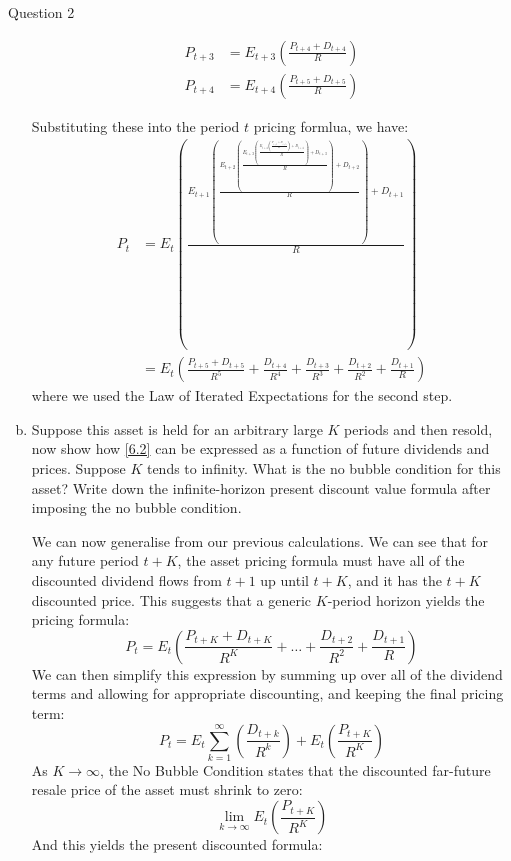\documentclass[a4paper]{article}
\newif\IfInSansMode
\begin{document}
\begin{questionbox}{Question 2}
\begin{enumerate}[(a)]
\begin{explanationbox}
\begin{align*}
					P_{t+3} &= E_{t+3} \left( \frac{P_{t+4} + D_{t+4}}{R} \right)\\
					P_{t+4} &= E_{t+4} \left( \frac{P_{t+5} + D_{t+5}}{R} \right)
				\end{align*}
			\end{explanationbox}
			\begin{explanationbox}
				Substituting these into the period \( t \) pricing formlua, we have:
				\begin{align*}
					P_t &= E_t \left( \frac{E_{t+1} \left( \frac{E_{t+2} \left( \frac{E_{t+3} \left( \frac{E_{t+4} \left( \frac{P_{t+5} + D_{t+5}}{R} \right) + D_{t+4}}{R} \right) + D_{t+3}}{R} \right) + D_{t+2}}{R} \right) + D_{t+1}}{R} \right)\\
					&= E_t \left( \frac{P_{t+5} + D_{t+5}}{R^5} + \frac{D_{t+4}}{R^4}+ \frac{D_{t+3}}{R^3}+ \frac{D_{t+2}}{R^2} + \frac{D_{t+1}}{R} \right)
				\end{align*}
				where we used the Law of Iterated Expectations for the second step.
			\end{explanationbox}
			\item Suppose this asset is held for an arbitrary large \( K \) periods and then resold, now show how \cref{6.2} can be expressed as a function of future dividends and prices. Suppose \( K \) tends to inﬁnity. What is the no bubble condition for this asset? Write down the inﬁnite-horizon present discount value formula after imposing the no bubble condition.
			\begin{explanationbox}
				We can now generalise from our previous calculations. We can see that for any future period \( t+K \), the asset pricing formula must have all of the discounted dividend ﬂows from \( t+1 \) up until \( t+K \), and it has the \( t+K \) discounted price. This suggests that a generic \( K \)-period horizon yields the pricing formula:
				\[
					P_t = E_t \left( \frac{P_{t+K} + D_{t+K}}{R^K} + \dots + \frac{D_{t+2}}{R^2} + \frac{D_{t+1}}{R} \right)
				\]
				We can then simplify this expression by summing up over all of the dividend terms and allowing for appropriate discounting, and keeping the ﬁnal pricing term:
				\[
					P_t = E_t \sum_{k=1}^\infty \left( \frac{D_{t+k}}{R^k} \right) + E_t \left( \frac{P_{t+K}}{R^K} \right)
				\]
				As \( K\rightarrow\infty \), the No Bubble Condition states that the discounted far-future resale price of the asset must shrink to zero:
				\[
					\lim_{k\rightarrow\infty} E_t \left( \frac{P_{t+K}}{R^K} \right)
				\]
				And this yields the present discounted formula:
				\[
\]
\end{explanationbox}
\end{enumerate}
\end{questionbox}
\end{document}
